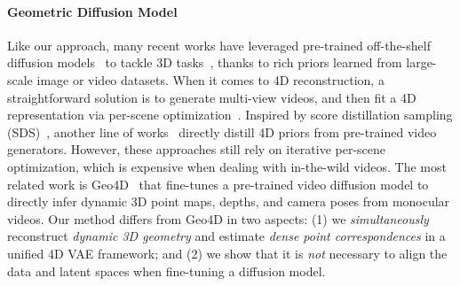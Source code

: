\paragraph{Geometric Diffusion Model}
Like our approach,
many recent works have leveraged pre-trained off-the-shelf diffusion models~\cite{rombach2022high,ho2022video,wang2023modelscope,singer2023makeavideo,blattmann2023align,ge2023preserve,wang2023videocomposer,guo2024animatediff,blattmann2023stable,zhang2024show,huang2024blue,xing2024dynamicrafter,kong2024hunyuanvideo,liang2025diffusion,garcia2025fine}
to tackle 3D tasks~\cite{gao2024cat3d,sargent2024zeronvs,chen2024mvsplat360,yu2024viewcrafter,szymanowicz2025bolt3d,li2025dso,wu2025amodal3r,ke2024repurposing,ye2024stablenormal,xu2024matters,song2025depthmaster,liu2023zero,shi2024mvdream,zheng2024free3d,voleti2025sv3d}, thanks to rich priors learned from large-scale image or video datasets.
When it comes to 4D reconstruction, a straightforward solution is to generate multi-view videos,
and then fit a 4D representation via per-scene optimization~\cite{xie2024sv4d,zeng2024stag4d,wu2025cat4d}.
Inspired by score distillation sampling (SDS)~\cite{pooledreamfusion},
another line of works~\cite{jiang2024consistentd,zhang20244diffusion,dreamscene4d,ren2023dreamgaussian4d,li2024dreammesh4d}
directly distill 4D priors from pre-trained video generators.
However, these approaches still rely on iterative per-scene optimization,
which is expensive when dealing with in-the-wild videos.
The most related work is Geo4D~\cite{jiang2025geo4d} that fine-tunes a pre-trained video diffusion model to directly infer dynamic 3D point maps, depths, and camera poses from monocular videos.
Our method differs from Geo4D in two aspects:
(1) we \emph{simultaneously} reconstruct \emph{dynamic 3D geometry} and estimate \emph{dense point correspondences} in a unified 4D VAE framework; and
(2) we show that it is \emph{not} necessary to align the data and latent spaces when fine-tuning a diffusion model.